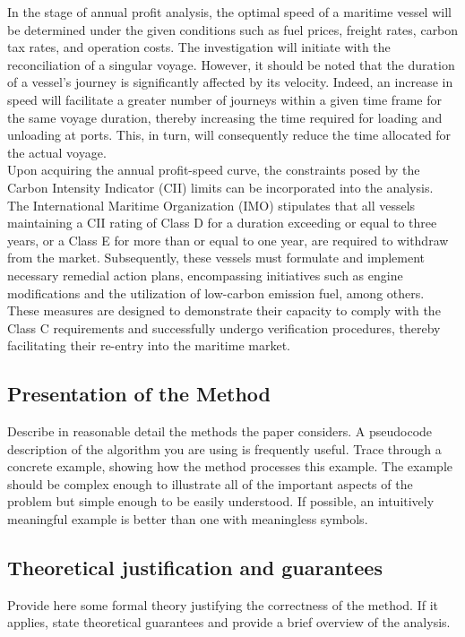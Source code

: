 \documentclass[a4paper,12pt]{article}
\begin{document}
In the stage of annual profit analysis, the optimal speed of a maritime vessel will be determined under the given conditions such as fuel prices, freight rates, carbon tax rates, and operation costs.
The investigation will initiate with the reconciliation of a singular voyage.
However, it should be noted that the duration of a vessel's journey is significantly affected by its velocity.
Indeed, an increase in speed will facilitate a greater number of journeys within a given time frame for the same voyage duration, thereby increasing the time required for loading and unloading at ports.
This, in turn, will consequently reduce the time allocated for the actual voyage.\\

Upon acquiring the annual profit-speed curve, the constraints posed by the Carbon Intensity Indicator (CII) limits can be incorporated into the analysis.
The International Maritime Organization (IMO) stipulates that all vessels maintaining a CII rating of Class D for a duration exceeding or equal to three years, or a Class E for more than or equal to one year, are required to withdraw from the market.
Subsequently, these vessels must formulate and implement necessary remedial action plans, encompassing initiatives such as engine modifications and the utilization of low-carbon emission fuel, among others.
These measures are designed to demonstrate their capacity to comply with the Class C requirements and successfully undergo verification procedures, thereby facilitating their re-entry into the maritime market.




\subsection{Presentation of the Method}
Describe in reasonable detail the methods the paper considers. A pseudocode description of
the algorithm you are using is frequently useful. Trace through a concrete example, showing
how the method processes this example. The example should be complex enough to
illustrate all of the important aspects of the problem but simple enough to be easily
understood. If possible, an intuitively meaningful example is better than one with
meaningless symbols.

\subsection{Theoretical justification and guarantees}
Provide here some formal theory justifying the correctness of the method. If it applies, state theoretical guarantees and provide a brief overview of the analysis.
\end{document}
